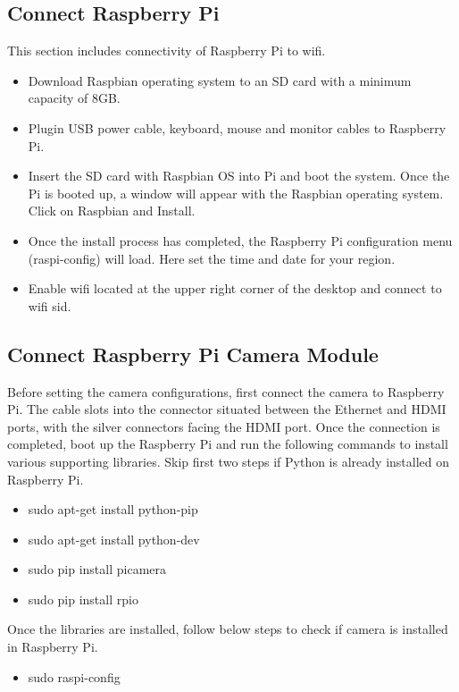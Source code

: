 \documentclass[sigconf]{acmart}
\begin{document}
\subsection{Connect Raspberry Pi}
This section includes connectivity of Raspberry Pi to wifi. 

\begin{itemize}
\item Download Raspbian operating system to an SD card with a minimum capacity of 8GB.
\item Plugin USB power cable, keyboard, mouse and monitor cables to Raspberry Pi.
\item Insert the SD card with Raspbian OS into Pi and boot the system. Once the 
Pi is booted up, a window will appear with the Raspbian operating system. Click on Raspbian and Install.
\item Once the install process has completed, the Raspberry Pi configuration 
menu (raspi-config) will load. Here set the time and date for your region.
\item Enable wifi located at the upper right corner of the desktop and connect to wifi sid.
\end{itemize}


\subsection{Connect Raspberry Pi Camera Module}
Before setting the camera configurations, first connect the camera to Raspberry Pi. 
The cable slots into the connector situated between the Ethernet and HDMI ports, with 
the silver connectors facing the HDMI port. Once the connection is completed, boot up 
the Raspberry Pi and run the following commands to install various supporting libraries. 
Skip first two steps if Python is already installed on Raspberry Pi.

\begin{itemize}
\item sudo apt-get install python-pip
\item sudo apt-get install python-dev
\item sudo pip install picamera
\item sudo pip install rpio
\end{itemize}

Once the libraries are installed, follow below steps to check if camera is installed in Raspberry Pi.
\begin{itemize}
\item sudo raspi-config
\end{itemize}
\end{document}
